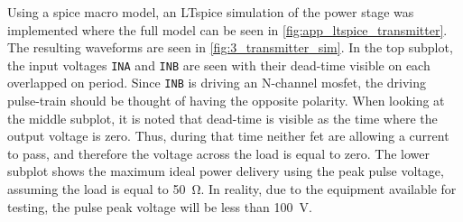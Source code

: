 Using a \gls{spice} macro model, an LTspice simulation of the power stage was implemented where the full model can be seen in \cref{fig:app_ltspice_transmitter}. The resulting waveforms are seen in \cref{fig:3_transmitter_sim}. In the top subplot, the input voltages \texttt{INA} and \texttt{INB} are seen with their dead-time visible on each overlapped on period. Since \texttt{INB} is driving an N-channel \gls{mosfet}, the driving pulse-train should be thought of having the opposite polarity. When looking at the middle subplot, it is noted that dead-time is visible as the time where the output voltage is zero. Thus, during that time neither \gls{fet} are allowing a current to pass, and therefore the voltage across the load is equal to zero. The lower subplot shows the maximum ideal power delivery using the peak pulse voltage, assuming the load is equal to \qty{50}{\ohm}. In reality, due to the equipment available for testing, the pulse peak voltage will be less than \qty{100}{\volt}.

